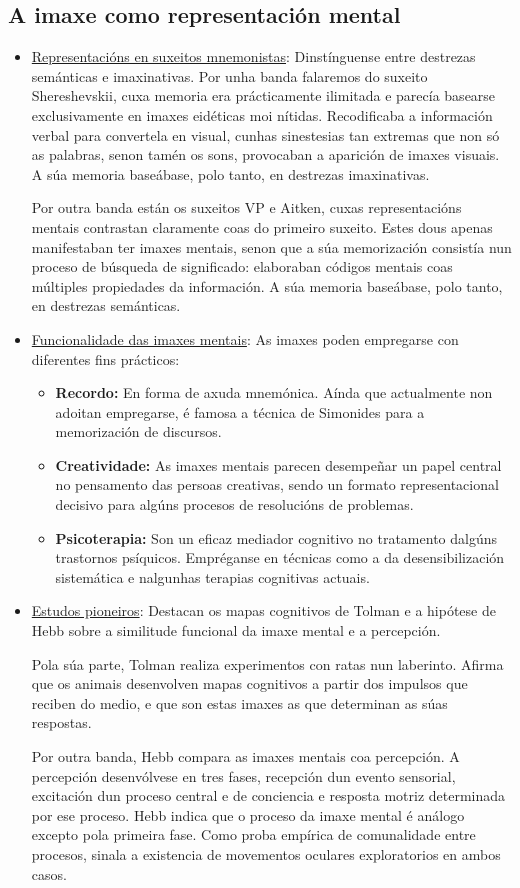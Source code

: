 \documentclass[a4paper,11pt]{article}
\begin{document}
\subsection{A imaxe como representación mental}
\begin{itemize}
	\item \underline{Representacións en suxeitos mnemonistas}: Dinstínguense entre destrezas 
	semánticas e imaxinativas. Por unha banda falaremos do suxeito Shereshevskii, cuxa memoria era 
	prácticamente ilimitada e parecía basearse exclusivamente en imaxes eidéticas moi nítidas. 
	Recodificaba a información verbal para convertela en visual, cunhas sinestesias tan extremas que 
	non só as palabras, senon tamén os sons, provocaban a aparición de imaxes visuais. A súa memoria 
	baseábase, polo tanto, en destrezas imaxinativas.
	
	Por outra banda están os suxeitos VP e Aitken, cuxas representacións mentais contrastan 
	claramente coas do primeiro suxeito. Estes dous apenas manifestaban ter imaxes mentais, senon 
	que a súa memorización consistía nun proceso de búsqueda de significado: elaboraban códigos 
	mentais coas múltiples propiedades da información. A súa memoria baseábase, polo tanto, en 
	destrezas semánticas.
	\item \underline{Funcionalidade das imaxes mentais}: As imaxes poden empregarse con diferentes 
	fins prácticos:
	\begin{itemize}
		\item \textbf{Recordo:} En forma de axuda mnemónica. Aínda que actualmente non adoitan 
		empregarse, é famosa a técnica de Simonides para a memorización de discursos.
		\item \textbf{Creatividade:} As imaxes mentais parecen desempeñar un papel central no 
		pensamento das persoas creativas, sendo un formato representacional decisivo para algúns 
		procesos de resolucións de problemas.
		\item \textbf{Psicoterapia:} Son un eficaz mediador cognitivo no tratamento dalgúns 
		trastornos psíquicos. Empréganse en técnicas como a da desensibilización sistemática e 
		nalgunhas terapias cognitivas actuais. 
	\end{itemize}
	\item \underline{Estudos pioneiros}: Destacan os mapas cognitivos de Tolman e a hipótese de Hebb 
	sobre a similitude funcional da imaxe mental e a percepción. 
	
	Pola súa parte, Tolman realiza experimentos con ratas nun laberinto. Afirma que os animais 
	desenvolven mapas cognitivos a partir dos impulsos que reciben do medio, e que son estas imaxes 
	as que determinan as súas respostas.
	
	Por outra banda, Hebb compara as imaxes mentais coa percepción. A percepción desenvólvese en 
	tres fases, recepción dun evento sensorial, excitación dun proceso central e de conciencia e 
	resposta motriz determinada por ese proceso. Hebb indica que o proceso da imaxe mental é análogo 
	excepto pola primeira fase. Como proba empírica de comunalidade entre procesos, sinala a 
	existencia de movementos oculares exploratorios en ambos casos.  
\end{itemize}
\end{document}
